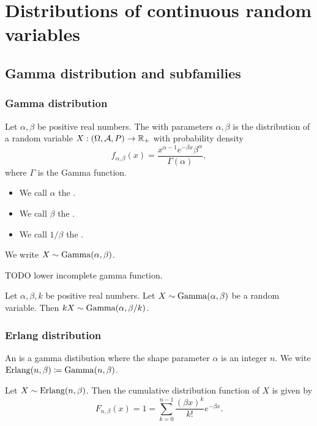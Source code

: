 \section{Distributions of continuous random variables}
\subsection{Gamma distribution and subfamilies}
\subsubsection{Gamma distribution}
\begin{definition}
Let $\alpha, \beta$ be positive real numbers. The  with parameters $\alpha, \beta$ is the distribution of a random variable $X: \sSet{\Omega, \mathcal{A}, P} \to \R_+$ with probability density
\[ f_{\alpha,\beta}(x) = \frac{x^{\alpha-1}e^{-\beta x}\beta^\alpha}{\Gamma(\alpha)}, \]
where $\Gamma$ is the Gamma function.
\begin{itemize}
\item We call $\alpha$ the .
\item We call $\beta$ the .
\item We call $1/\beta$ the .
\end{itemize}
We write $X \sim \operatorname{Gamma}(\alpha,\beta)$.
\end{definition}
TODO lower incomplete gamma function.

\begin{lemma}
Let $\alpha,\beta, k$ be positive real numbers. Let $X \sim \operatorname{Gamma}(\alpha, \beta)$ be a random variable. Then $kX \sim \operatorname{Gamma}(\alpha, \beta / k)$.
\end{lemma}

\subsubsection{Erlang distribution}
\begin{definition}
An  is a gamma distibution where the shape parameter $\alpha$ is an integer $n$. We wite $\operatorname{Erlang}(n, \beta) \coloneqq \operatorname{Gamma}(n, \beta)$.
\end{definition}

\begin{proposition} \label{ErlangCDF}
Let $X \sim \operatorname{Erlang}(n, \beta)$. Then the cumulative distribution function of $X$ is given by
\[ F_{n,\beta}(x) = 1 = \sum_{k=0}^{n-1} \frac{(\beta x)^k}{k!}e^{-\beta x}. \]
\end{proposition}

